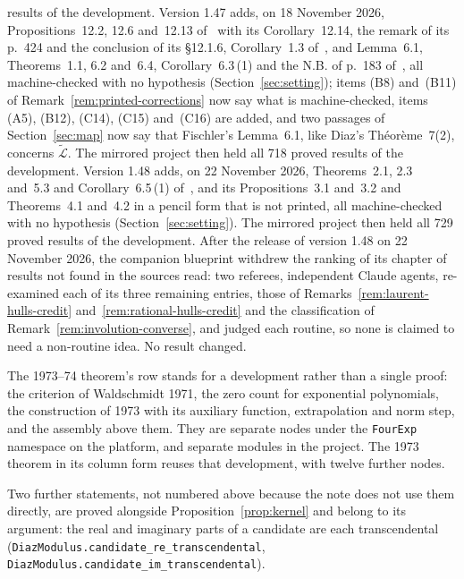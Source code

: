 \documentclass[11pt,a4paper]{article}
\theoremstyle{plain}
\theoremstyle{definition}
\newcommand{\aLogs}{\widetilde{\mathcal{L}}}
\begin{document}
results of the development.
Version 1.47 adds, on 18 November 2026, Propositions~12.2, 12.6 and~12.13 of~\cite{waldschmidt-book} with its
Corollary~12.14, the remark of its p.~424 and the conclusion of its \S12.1.6, Corollary~1.3
of~\cite{waldschmidt-2005b}, and Lemma~6.1, Theorems~1.1, 6.2 and~6.4, Corollary~6.3\,(1) and the N.B. of p.~183
of~\cite{fischler-2001}, all machine-checked with no hypothesis (Section~\ref{sec:setting}); items (B8) and~(B11) of
Remark~\ref{rem:printed-corrections} now say what is machine-checked, items (A5), (B12), (C14), (C15) and~(C16) are
added, and two passages of Section~\ref{sec:map} now say that Fischler's Lemma~6.1, like Diaz's
Th\'eor\`eme~7(2), concerns $\aLogs$. The mirrored project then held all 718 proved results of the development.
Version 1.48 adds, on 22 November 2026, Theorems~2.1, 2.3 and~5.3 and Corollary~6.5\,(1) of~\cite{fischler-2001},
and its Propositions~3.1 and~3.2 and Theorems~4.1 and~4.2 in a pencil form that is not printed, all machine-checked
with no hypothesis (Section~\ref{sec:setting}). The mirrored project then held all 729 proved results of the
development. After the release of version 1.48 on 22 November 2026, the companion blueprint withdrew the ranking of its chapter of results not
found in the sources read: two referees, independent Claude agents, re-examined each of its three remaining entries, those of
Remarks~\ref{rem:laurent-hulls-credit} and~\ref{rem:rational-hulls-credit} and the classification of
Remark~\ref{rem:involution-converse}, and judged each routine, so none is claimed to need a non-routine idea. No
result changed.

The 1973--74 theorem's row stands for a development rather than a single proof: the criterion of
Waldschmidt 1971, the zero count for exponential polynomials, the construction of 1973 with its
auxiliary function, extrapolation and norm step, and the assembly above them. They are separate
nodes under the \nolinkurl{FourExp} namespace on the platform, and separate modules in the
project. The 1973 theorem in its column form reuses that development, with twelve further nodes.

Two further statements, not numbered above because the note does not use them directly, are
proved alongside Proposition~\ref{prop:kernel} and belong to its argument: the real and imaginary
parts of a candidate are each transcendental
(\nolinkurl{DiazModulus.candidate_re_transcendental},
\nolinkurl{DiazModulus.candidate_im_transcendental}).
\end{document}
